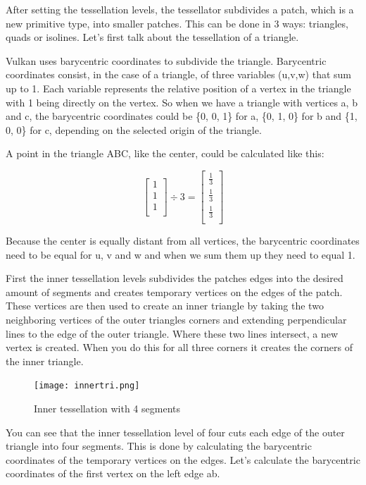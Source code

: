 \documentclass[12pt]{report} \usepackage{preamble}
\begin{document}
After setting the tessellation levels, the tessellator subdivides a patch, which is
a new primitive type, into smaller patches.
This can be done in 3 ways: triangles, quads or isolines.
Let's first talk about the tessellation of a triangle.

Vulkan uses barycentric coordinates to subdivide the triangle. Barycentric
coordinates consist, in the case of a triangle, of three variables (u,v,w) that sum up to 1.
Each variable represents the relative position of a vertex in the triangle with 1 being directly
on the vertex. So when we have a triangle with vertices a, b and c, the barycentric coordinates
could be \{0, 0, 1\} for a, \{0, 1, 0\} for b and \{1, 0, 0\} for c, depending on the selected
origin of the triangle. \cite{tessellation}

A point in the triangle ABC, like the center, could be calculated like this:

\[
	\begin{bmatrix}
		1 \\
		1 \\
		1 \\
	\end{bmatrix}
	\div
	3
	=
	\begin{bmatrix}
		\frac{1}{3} \\
		\frac{1}{3} \\
		\frac{1}{3} \\
	\end{bmatrix}
\]

Because the center is equally distant from all vertices,
the barycentric coordinates need to be equal for u, v and w
and when we sum them up they need to equal 1.

First the inner tessellation levels subdivides the patches edges into the desired amount of segments and
creates temporary vertices on the edges of the patch. These vertices are then used to create an
inner triangle by taking the two neighboring vertices of the outer triangles corners and extending perpendicular
lines to the edge of the outer triangle. Where these two lines intersect, a new vertex is created. When you
do this for all three corners it creates the corners of the inner triangle. \cite{tessellation}

\begin{figure}[hbtp]
	\centering \texttt{[image: innertri.png]}
	\caption{Inner tessellation with 4 segments}
	\cite{fig:inner-tessellation}
\end{figure} \Floatbarrier

You can see that the inner tessellation level of four cuts each edge of the outer triangle into four segments.
This is done by calculating the barycentric coordinates of the temporary vertices on the edges. Let's
calculate the barycentric coordinates of the first vertex on the left edge ab.
\end{document}
